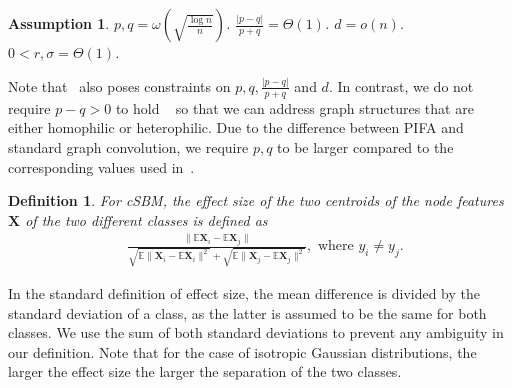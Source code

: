 \documentclass{article} \usepackage{iclr2022_conference,times}
\newtheorem{assumption}[theorem]{Assumption}
\newtheorem{definition}[theorem]{Definition}
\begin{document}
\begin{assumption}\label{ass:1}
	$p,q=\omega(\sqrt{\frac{\log n}{n}})$. $\frac{|p-q|}{p+q}=\Theta(1)$. $d=o(n)$. $0 < r,\sigma =\Theta(1)$.
\end{assumption}
Note that~\cite{baranwal2021graph} also poses constraints on $p,q, \frac{|p-q|}{p+q}$ and $d$. In contrast, we do not require $p-q>0$ to hold ~\citep{baranwal2021graph,li2019optimizing} so that we can address graph structures that are either homophilic or heterophilic. Due to the difference between PIFA and standard graph convolution, we require $p,q$ to be larger compared to the corresponding values used in~\cite{baranwal2021graph}.

\begin{definition}\label{def:eff_size}
	For cSBM, the effect size of the two centroids of the node features $\mathbf{X}$ of the two different classes is defined as
	\begin{align}
		& \frac{\|\mathbb{E}\mathbf{X}_i - \mathbb{E}\mathbf{X}_j\|}{\sqrt{\mathbb{E}\|\mathbf{X}_i-\mathbb{E}\mathbf{X}_i\|^2} + \sqrt{\mathbb{E}\|\mathbf{X}_j-\mathbb{E}\mathbf{X}_j\|^2}},\text{ where }y_i\neq y_j.
	\end{align}
\end{definition}
In the standard definition of effect size, the mean difference is divided by the standard deviation of a class, as the latter is assumed to be the same for both classes. We use the sum of both standard deviations to prevent any ambiguity in our definition. Note that for the case of isotropic Gaussian distributions, the larger the effect size the larger the separation of the two classes.
\end{document}
